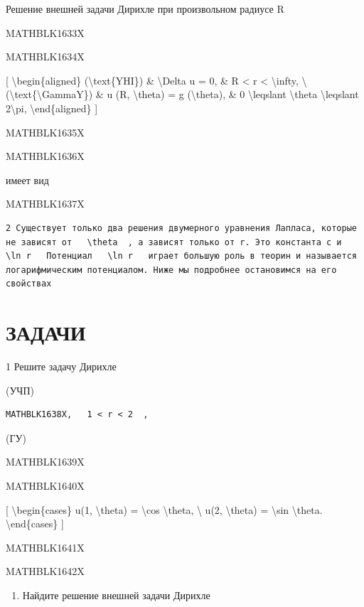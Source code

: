 \documentclass[
]{article}
\providecommand{\tightlist}{%
  \setlength{\itemsep}{0pt}\setlength{\parskip}{0pt}}
\begin{document}
Решение внешней задачи Дирихле при произвольном радиусе R

MATHBLK1633X

MATHBLK1634X

{[} \textbackslash begin\{aligned\} (\textbackslash text\{YHI\}) \&
\textbackslash Delta u = 0, \& R \textless{} r \textless{}
\textbackslash infty, \textbackslash{}
(\textbackslash text\{\textbackslash GammaY\}) \& u (R,
\textbackslash theta) = g (\textbackslash theta), \& 0
\textbackslash leqslant \textbackslash theta \textbackslash leqslant
2\textbackslash pi, \textbackslash end\{aligned\} {]}

MATHBLK1635X

MATHBLK1636X

имеет вид

MATHBLK1637X

\begin{verbatim}
2 Существует только два решения двумерного уравнения Лапласа, которые не зависят от   \theta  , а зависят только от r. Это константа c и   \ln r   Потенциал   \ln r   играет большую роль в теорин и называется логарифмическим потенциалом. Ниже мы подробнее остановимся на его свойствах
\end{verbatim}

\section{ЗАДАЧИ}\label{ux437ux430ux434ux430ux447ux438-13}

1 Решите задачу Дирихле

(УЧП)

\begin{verbatim}
MATHBLK1638X,   1 < r < 2  ,
\end{verbatim}

(ГУ)

MATHBLK1639X

MATHBLK1640X

{[} \textbackslash begin\{cases\} u(1, \textbackslash theta) =
\textbackslash cos \textbackslash theta, \textbackslash{} u(2,
\textbackslash theta) = \textbackslash sin \textbackslash theta.
\textbackslash end\{cases\} {]}

MATHBLK1641X

MATHBLK1642X

\begin{enumerate}
\def\labelenumi{\arabic{enumi}.}
\setcounter{enumi}{1}
\tightlist
\item
  Найдите решение внешней задачи Дирихле
\end{enumerate}
\end{document}

